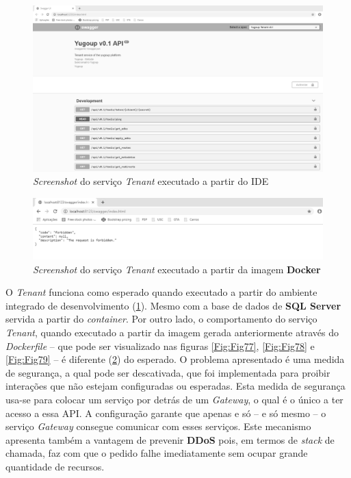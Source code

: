 \begin{figure}[hbt!]
\centering
\includegraphics[width=0.9\linewidth]{Cap6/TenantScreenShot.png}
\caption{\textit{Screenshot} do serviço \textit{Tenant} executado a partir do IDE}
\label{Fig:Fig83}
\end{figure}

\begin{figure}[hbt!]
\centering
\includegraphics[width=0.9\linewidth]{Cap6/TenantServiceNotRespondingScreenShot.png}
\caption{\textit{Screenshot} do serviço \textit{Tenant} executado a partir da imagem \textbf{Docker}}
\label{Fig:Fig84}
\end{figure}

\hspace{1cm}O \textit{Tenant} funciona como esperado quando executado a partir do ambiente integrado de desenvolvimento (\ref{Fig:Fig83}). Mesmo com a base de dados de \textbf{SQL Server} servida a partir do \textit{container}. Por outro lado, o comportamento do serviço \textit{Tenant}, quando executado a partir da imagem gerada anteriormente através do \textit{Dockerfile} -- que pode ser visualizado nas figuras \ref{Fig:Fig77}, \ref{Fig:Fig78} e \ref{Fig:Fig79} -- é diferente  (\ref{Fig:Fig84}) do esperado. O problema apresentado é uma medida de segurança, a qual pode ser descativada, que foi implementada para proibir interações que não estejam configuradas ou esperadas. Esta medida de segurança usa-se para colocar um serviço por detrás de um \textit{Gateway}, o qual é o único a ter acesso a essa API. A configuração garante que apenas e só -- e só mesmo -- o serviço \textit{Gateway} consegue comunicar com esses serviços. Este mecanismo apresenta também a vantagem de prevenir \textbf{DDoS} pois, em termos de \textit{stack} de chamada, faz com que o pedido falhe imediatamente sem ocupar grande quantidade de recursos.

